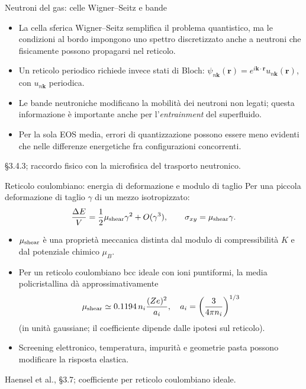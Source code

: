 \begin{frame}[t]{Neutroni del gas: celle Wigner--Seitz e bande}
\small
\begin{itemize}
\item La cella sferica Wigner--Seitz semplifica il problema quantistico, ma le condizioni al bordo impongono uno spettro discretizzato anche a neutroni che fisicamente possono propagarsi nel reticolo.
\item Un reticolo periodico richiede invece stati di Bloch: $\psi_{n\mathbf k}(\mathbf r)=e^{i\mathbf k\cdot\mathbf r}u_{n\mathbf k}(\mathbf r)$, con $u_{n\mathbf k}$ periodica.
\item Le bande neutroniche modificano la mobilità dei neutroni non legati; questa informazione è importante anche per l'\emph{entrainment} del superfluido.
\item Per la sola EOS media, errori di quantizzazione possono essere meno evidenti che nelle differenze energetiche fra configurazioni concorrenti.
\end{itemize}
{\footnotesize §3.4.3; raccordo fisico con la microfisica del trasporto neutronico.}
\end{frame}

\begin{frame}[t]{Reticolo coulombiano: energia di deformazione e modulo di taglio}
\small
Per una piccola deformazione di taglio $\gamma$ di un mezzo isotropizzato:
\[
\frac{\Delta E}{V}=\frac12\mu_{\rm shear}\gamma^2+O(\gamma^3),
\qquad \sigma_{xy}=\mu_{\rm shear}\gamma.
\]
\begin{itemize}
\item $\mu_{\rm shear}$ è una proprietà meccanica distinta dal modulo di compressibilità $K$ e dal potenziale chimico $\mu_B$.
\item Per un reticolo coulombiano bcc ideale con ioni puntiformi, la media policristallina dà approssimativamente
\[
\mu_{\rm shear}\simeq0.1194\,n_i\frac{(Ze)^2}{a_i},\quad
 a_i=\left(\frac{3}{4\pi n_i}\right)^{1/3}
\]
(in unità gaussiane; il coefficiente dipende dalle ipotesi sul reticolo).
\item Screening elettronico, temperatura, impurità e geometrie pasta possono modificare la risposta elastica.
\end{itemize}
{\footnotesize Haensel et al., §3.7; coefficiente per reticolo coulombiano ideale.}
\end{frame}

